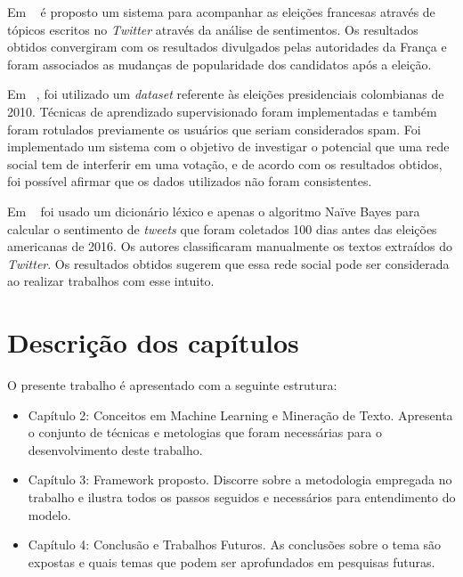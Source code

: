 Em  ~\cite{wegrzyn2012tweets} é proposto um sistema para acompanhar as eleições francesas através de tópicos escritos no \textit{Twitter} através da análise de sentimentos.
Os resultados obtidos convergiram com os resultados divulgados pelas autoridades da França e foram associados as mudanças de popularidade dos candidatos após a eleição.



Em ~\cite{guzman}, foi utilizado um \textit{dataset} referente às eleições presidenciais colombianas de 2010. Técnicas de aprendizado supervisionado foram implementadas e também foram 
rotulados previamente os usuários que seriam considerados spam. Foi implementado um sistema com o objetivo de investigar o potencial que uma rede social tem de interferir em 
uma votação, e de acordo com os resultados obtidos, foi possível afirmar que os dados utilizados não foram consistentes.



Em ~\cite{joyce} foi usado um dicionário léxico e apenas o algoritmo Naïve Bayes para calcular o sentimento de \textit{tweets} que foram coletados 100 dias antes das eleições americanas
de 2016. Os autores classificaram manualmente os textos extraídos do \textit{Twitter}. Os resultados obtidos sugerem que essa rede social pode ser considerada ao realizar 
trabalhos com esse intuito.

\section{Descrição dos capítulos}

O presente trabalho é apresentado com a seguinte estrutura:

\begin{itemize}
	\item Capítulo 2: Conceitos em Machine Learning e Mineração de Texto. Apresenta o conjunto de técnicas
	      e metologias que foram necessárias para o desenvolvimento deste trabalho.
	\item Capítulo 3: Framework proposto. Discorre sobre a metodologia empregada no trabalho e ilustra todos os passos
	      seguidos e necessários para entendimento do modelo.
	\item Capítulo 4: Conclusão e Trabalhos Futuros. As conclusões sobre o tema são expostas e  quais temas que podem ser aprofundados em pesquisas futuras.
\end{itemize}